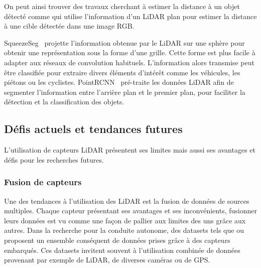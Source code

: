 \documentclass[a4paper, french, 10pt, onecolumn, notitlepage, roman]{article}
\begin{document}
On peut ainsi trouver des travaux cherchant à estimer la distance à un objet détecté comme \cite{khaled:icarce:2023} qui utilise l'information d'un LiDAR plan pour estimer la distance à une cible détectée dans une image RGB.

SqueezeSeg~\cite{wu:icra:2018} projette l'information obtenue par le LiDAR sur une sphère pour obtenir une représentation sous la forme d'une grille.
Cette forme est plus facile à adapter aux réseaux de convolution habituels.
L'information alors transmise peut être classifiée pour extraire divers éléments d'intérêt comme les véhicules, les piétons ou les cyclistes.
PointRCNN~\cite{shi:cvpr:2019} pré-traite les données LiDAR afin de segmenter l'information entre l'arrière plan et le premier plan, pour faciliter la détection et la classification des objets.

\subsection{Défis actuels et tendances futures}
L'utilisation de capteurs LiDAR présentent ses limites mais aussi ses avantages et défis pour les recherches futures.


\subsubsection{Fusion de capteurs}
Une des tendances à l'utilisation des LiDAR est la fusion de données de sources multiples.
Chaque capteur présentant ses avantages et ses inconvénients, fusionner leurs données est vu comme une façon de pallier aux limites des uns grâce aux autres.
Dans la recherche pour la conduite autonome, des datasets tels que \cite{maddern:ijrr:2017} ou \cite{geiger:cvpr:2012,geiger:ijrr:2013} proposent un ensemble conséquent de données prises grâce à des capteurs embarqués.
Ces datasets invitent souvent à l'utilisation combinée de données provenant par exemple de LiDAR, de diverses caméras ou de GPS.
\end{document}
